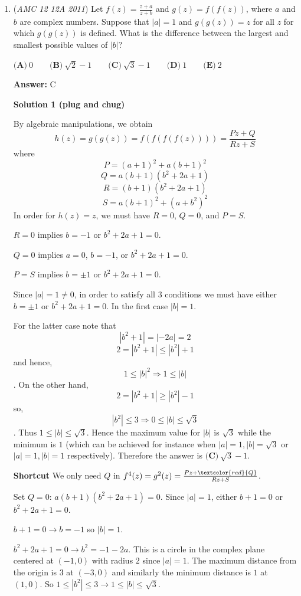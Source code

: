 \begin{enumerate}
 


	\item (\textit{AMC 12 12A 2011}) Let $f(z)= \frac{z+a}{z+b}$ and $g(z)=f(f(z))$, where $a$ and $b$ are complex numbers. Suppose that $\left| a \right| = 1$ and $g(g(z))=z$ for all $z$ for which $g(g(z))$ is defined. What is the difference between the largest and smallest possible values of $\left| b \right|$?


 $\textbf{(A)}\ 0 \qquad \textbf{(B)}\ \sqrt{2}-1 \qquad \textbf{(C)}\ \sqrt{3}-1 \qquad \textbf{(D)}\ 1 \qquad \textbf{(E)}\ 2$

 \textbf{Answer: }C



\textbf{Solution 1 (plug and chug)}

By algebraic manipulations, we obtain 
 \[h(z)=g(g(z))=f(f(f(f(z))))=\frac{Pz+Q}{Rz+S}\] where 
 \[P=(a+1)^2+a(b+1)^2\]
 \[Q=a(b+1)(b^2+2a+1)\]
 \[R=(b+1)(b^2+2a+1)\]
 \[S=a(b+1)^2+(a+b^2)^2\]In order for $h(z)=z$, we must have $R=0$, $Q=0$, and $P=S$. 

 $R=0$ implies $b=-1$ or $b^2+2a+1=0$.

 $Q=0$ implies $a=0$, $b=-1$, or $b^2+2a+1=0$.

 $P=S$ implies $b=\pm1$ or $b^2+2a+1=0$. 

 Since $|a|=1\neq 0$, in order to satisfy all 3 conditions we must have either $b=\pm1$ or $b^2+2a+1=0$. In the first case $|b|=1$. 

 For the latter case note that 
 \[|b^2+1|=|-2a|=2\]
 \[2=|b^2+1|\leq |b^2|+1\]and hence, 
 \[1\leq|b|^2\Rightarrow1\leq |b|\]. On the other hand, 
 \[2=|b^2+1|\geq|b^2|-1\]so, 
 \[|b^2|\leq 3\Rightarrow0\leq |b|\leq \sqrt{3}\]. Thus $1\leq |b|\leq \sqrt{3}$. Hence the maximum value for $|b|$ is $\sqrt{3}$ while the minimum is $1$ (which can be achieved for instance when $|a|=1,|b|=\sqrt{3}$ or $|a|=1,|b|=1$ respectively). Therefore the answer is $\boxed{\textbf{(C)}\ \sqrt{3}-1}$.

 \textbf{Shortcut} We only need $Q$ in $f^4(z)=g^2(z)=\frac{Pz+\textcolor{red}{Q}}{Rz+S}$.

 Set $Q=0$: $a(b+1)\left(b^2+2a+1\right)=0$. Since $|a|=1$, either $b+1=0$ or $b^2+2a+1=0$.

 $b+1=0\rightarrow b=-1$ so $|b|=1$.

 $b^2+2a+1=0\rightarrow b^2=-1-2a$. This is a circle in the complex plane centered at $(-1,0)$ with radius $2$ since $|a|=1$. The maximum distance from the origin is $3$ at $(-3,0)$ and similarly the minimum distance is $1$ at $(1,0)$. So $1\le |b^2|\le 3\rightarrow 1\le |b|\le \sqrt{3}$.


\end{enumerate}
